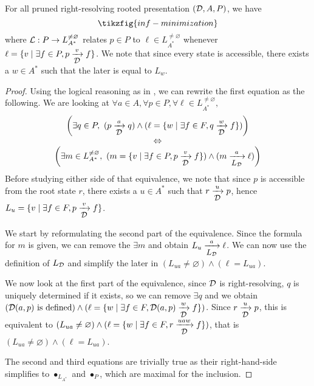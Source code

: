 \begin{proposition}
	For all pruned right-resolving rooted presentation $({\mathcal{D}},A,P)$, we have
	\[ \tikzfig{inf-minimization}\]
	where ${\mathcal{L}} : P \to L^{\neq \varnothing}_{A^*}$ relates $p \in P$ to $\ell \in L^{\neq \varnothing}_{A^*}$ whenever $\ell = \{ v \mid \exists f \in P, p \xrightarrow[\text{\small${\mathcal{D}}$}]{v} f\}$. We note that since every state is accessible, there exists a $w \in A^*$ such that the later is equal to $L_w$.
\end{proposition}
\begin{proof}
	Using the logical reasoning as in , we can rewrite the first equation as the following. We are looking at $\forall a \in A, \forall p \in P, \forall \ell \in L^{\neq \varnothing}_{A^*},$
	\[ \begin{array}{c} \left(\exists q\in P,~  (p \xrightarrow[\text{\small${\mathcal{D}}$}]{a} q)\land (\ell = \{ w \mid \exists f \in F, q \xrightarrow[\text{\small${\mathcal{D}}$}]{w} f\}) \right) \\ \Leftrightarrow \\ \left(\exists m \in L^{\neq \varnothing}_{A^*},~  (m = \{ v \mid \exists f \in P, p \xrightarrow[\text{\small${\mathcal{D}}$}]{v} f\}) \land (m \xrightarrow[\text{\small$L_{\mathcal{D}}$}]{a} \ell)\right) \end{array} \]
	Before studying either side of that equivalence, we note that since $p$ is accessible from the root state $r$, there exists a $u \in A^*$ such that $r \xrightarrow[\text{\small${\mathcal{D}}$}]{u} p$, hence $L_u = \{ v \mid \exists f \in F, p \xrightarrow[\text{\small${\mathcal{D}}$}]{v} f\}$.
	
	We start by reformulating the second part of the equivalence.  Since the formula for $m$ is given, we can remove the $\exists m$ and obtain $L_u \xrightarrow[\text{\small$L_{\mathcal{D}}$}]{a} \ell$. We can now use the definition of $L_{\mathcal{D}}$ and simplify the later in $(L_{ua} \neq \varnothing) \land (\ell = L_{ua})$.
	
	We now look at the first part of the equivalence, since ${\mathcal{D}}$ is right-resolving, $q$ is uniquely determined if it exists, so we can remove $\exists q$ and we obtain $({\mathcal{D}}(a,p) \text{ is defined}) \land (\ell = \{ w \mid \exists f \in F, {\mathcal{D}}(a,p) \xrightarrow[\text{\small${\mathcal{D}}$}]{w} f\})$. Since  $r \xrightarrow[\text{\small${\mathcal{D}}$}]{u} p$, this is equivalent to $(L_{ua} \neq \varnothing) \land (\ell = \{ w \mid \exists f \in F, r \xrightarrow[\text{\small${\mathcal{D}}$}]{uaw} f\})$, that is $(L_{ua} \neq \varnothing) \land (\ell = L_{ua})$.
	
	
	The second and third equations are trivially true as their right-hand-side simplifies to $\bullet_{L_{A^*}}$ and $\bullet_{P}$, which are maximal for the inclusion.
\end{proof}

